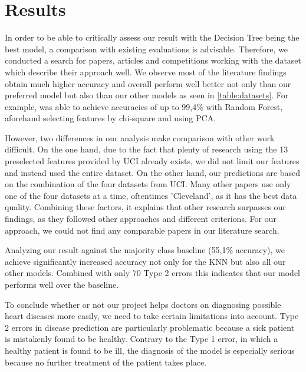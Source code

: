 
\section{Results} \label{sec:results}

In order to be able to critically assess our result with the Decision Tree being the best model, a comparison with existing evaluations is advisable. Therefore, we conducted a search for papers, articles and competitions working with the dataset which describe their approach well. We observe most of the literature findings obtain much higher accuracy \citep{alotaibi2019, garate-escamila2020, uyar2017} and overall perform well better not only than our preferred model but also than our other models as seen in \cref{table:datasets}. For example, \citet{garate-escamila2020} was able to achieve accuracies of up to 99,4\% with Random Forest, aforehand selecting features by chi-square and using PCA.  

However, two differences in our analysis make comparison with other work difficult. On the one hand, due to the fact that plenty of research using the 13 preselected features provided by UCI already exists, we did not limit our features and instead used the entire dataset. On the other hand, our predictions are based on the combination of the four datasets from UCI. Many other papers use only one of the four datasets at a time, oftentimes 'Cleveland', as it has the best data quality. Combining these factors, it explains that other research surpasses our findings, as they followed other approaches and different criterions. For our approach, we could not find any comparable papers in our literature search. 

Analyzing our result against the majority class baseline (55,1\% accuracy), we achieve significantly increased accuracy not only for the KNN but also all our other models. Combined with only 70 Type 2 errors this indicates that our model performs well over the baseline. 

To conclude whether or not our project helps doctors on diagnosing possible heart diseases more easily, we need to take certain limitations into account. Type 2 errors in disease prediction are particularly problematic because a sick patient is mistakenly found to be healthy. Contrary to the Type 1 error, in which a healthy patient is found to be ill, the diagnosis of the model is especially serious because no further treatment of the patient takes place.  

